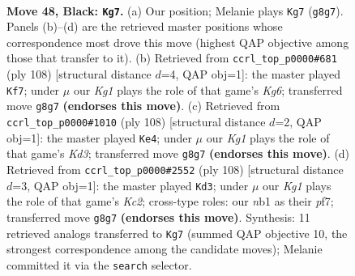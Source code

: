 \documentclass[11pt]{article}
\begin{document}
\clearpage

\begin{figure}[p]\centering
\begin{subfigure}{0.46\textwidth}\centering
\resizebox{\linewidth}{!}{%
\newchessgame
\chessboard[
  setfen={6k1/4B3/p1p5/8/8/7b/5K2/1N6 b - - 0 48},
  showmover=false,
  pgfstyle=straightmove, color=movearrow, markmove={g8-g7}
]}
\caption{}
\end{subfigure}\hfill
\begin{subfigure}{0.46\textwidth}\centering
\resizebox{\linewidth}{!}{%
\newchessgame
\chessboard[
  setfen={3b4/p2P4/6K1/8/8/k7/8/3B4 w - - 0 55},
  showmover=false,
  pgfstyle=straightmove, color=movearrow, markmove={g6-f7}
]}
\caption{}
\end{subfigure}
\\[4pt]
\begin{subfigure}{0.46\textwidth}\centering
\resizebox{\linewidth}{!}{%
\newchessgame
\chessboard[
  setfen={8/6k1/8/8/5PPb/3K4/B7/8 w - - 1 55},
  showmover=false,
  pgfstyle=straightmove, color=movearrow, markmove={d3-e4}
]}
\caption{}
\end{subfigure}\hfill
\begin{subfigure}{0.46\textwidth}\centering
\resizebox{\linewidth}{!}{%
\newchessgame
\chessboard[
  setfen={8/5p2/5B2/3k4/1b6/8/2K2PP1/8 w - - 7 55},
  showmover=false,
  pgfstyle=straightmove, color=movearrow, markmove={c2-d3}
]}
\caption{}
\end{subfigure}
\caption{\textbf{Move 48, Black: \texttt{Kg7}.} (a) Our position; Melanie plays \texttt{Kg7} (\texttt{g8g7}). Panels (b)--(d) are the retrieved master positions whose correspondence most drove this move (highest QAP objective among those that transfer to it). (b) Retrieved from \texttt{ccrl\_top\_p0000\#681} (ply 108) [structural distance $d$=4, QAP obj=1]: the master played \texttt{Kf7}; under $\mu$ our \emph{Kg1} plays the role of that game's \emph{Kg6}; transferred move \texttt{g8g7} \textbf{(endorses this move)}. (c) Retrieved from \texttt{ccrl\_top\_p0000\#1010} (ply 108) [structural distance $d$=2, QAP obj=1]: the master played \texttt{Ke4}; under $\mu$ our \emph{Kg1} plays the role of that game's \emph{Kd3}; transferred move \texttt{g8g7} \textbf{(endorses this move)}. (d) Retrieved from \texttt{ccrl\_top\_p0000\#2552} (ply 108) [structural distance $d$=3, QAP obj=1]: the master played \texttt{Kd3}; under $\mu$ our \emph{Kg1} plays the role of that game's \emph{Kc2}; cross-type roles: our \emph{n}b1 as their \emph{p}f7; transferred move \texttt{g8g7} \textbf{(endorses this move)}. Synthesis: 11 retrieved analogs transferred to \texttt{Kg7} (summed QAP objective 10, the strongest correspondence among the candidate moves); Melanie committed it via the \texttt{search} selector.}
\label{fig:thought-m95}
\end{figure}
\end{document}
